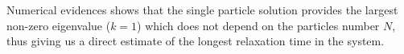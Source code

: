 \documentclass[aps,showpacs,twocolumn,floatfix,prx,superscriptaddress]{revtex4-1}
\begin{document}
Numerical evidences shows that the single particle solution provides the largest non-zero eigenvalue ($k=1$) which does not depend on the particles number $N$, thus giving us a direct estimate of the longest relaxation time in the system.  

\end{document}
